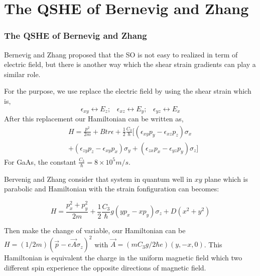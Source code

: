 \documentclass{beamer}
\begin{document}
\section{The QSHE of Bernevig and Zhang}
\begin{frame}
\frametitle{The QSHE of Bernevig and Zhang}
Bernevig and Zhang proposed that the SO is not easy to realized in term of
electric field, but there is another way which the shear strain gradients
can play a similar role.

For the purpose, we use replace the electric field by using the shear
strain which is,
\begin{equation*} \label{strainelectricfieldanalogy}
\epsilon_{xy} \leftrightarrow E_z;\;\;\; \epsilon_{xz} \leftrightarrow
E_y;\;\;\;\epsilon_{yz} \leftrightarrow E_x
\end{equation*}
After this replacement our Hamiltonian can be written as,
\begin{eqnarray*}
& H = \frac{p^2}{2m} + B tr{\epsilon} +\frac{1}{2}
\frac{C_3}{\hbar}
[ (\epsilon_{xy} p_y - \epsilon_{xz} p_z) \sigma_x  \nonumber \\
& +(\epsilon_{zy} p_z - \epsilon_{xy} p_x) \sigma_y + (\epsilon_{zx}
p_x - \epsilon_{yz} p_y) \sigma_z ]
\end{eqnarray*}
For GaAs, the constant $\frac{C_3}{\hbar} = 8 \times
10^5 m/s$.
\end{frame}

\begin{frame}
Bervenig and Zhang consider that system in quantum well in $xy$ plane which
is parabolic and Hamiltonian with the strain fonfiguration can becomes:

\begin{equation*}
H= \frac{p_x^2 + p_y^2}{2m} + \frac{1}{2} \frac{C_3}{\hbar}g (y p_x
- x  p_y)\sigma_z + D(x^2 + y^2)
\end{equation*}

Then make the change of variable, our Hamiltonian can be $H =
(1/2m) (\vec{p} - e \vec{A} \sigma_{z})^2$ with ${\vec{A} =
(m C_3 g/2 \hbar e) (y, -x, 0)}$. This Hamiltonian is equivalent the
charge in the uniform magnetic field which two different spin experience
the opposite directions of magnetic field.

\end{frame}
\end{document}
